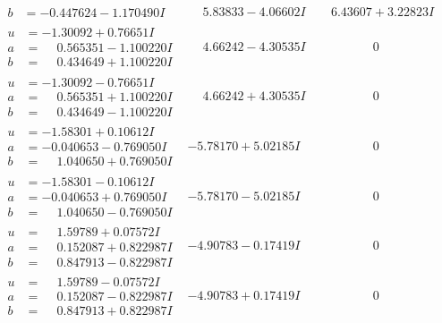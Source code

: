 \documentclass[1p]{elsarticle_modified}
\theoremstyle{definition}
\begin{document}
$$\begin{array}{c|c|c}
\begin{aligned}
b &= -0.447624 - 1.170490 I\end{aligned}
 & \phantom{-}5.83833 - 4.06602 I & \phantom{-}6.43607 + 3.22823 I \\ \hline\begin{aligned}
u &= -1.30092 + 0.76651 I \\
a &= \phantom{-}0.565351 - 1.100220 I \\
b &= \phantom{-}0.434649 + 1.100220 I\end{aligned}
 & \phantom{-}4.66242 - 4.30535 I & \phantom{-0.000000 } 0 \\ \hline\begin{aligned}
u &= -1.30092 - 0.76651 I \\
a &= \phantom{-}0.565351 + 1.100220 I \\
b &= \phantom{-}0.434649 - 1.100220 I\end{aligned}
 & \phantom{-}4.66242 + 4.30535 I & \phantom{-0.000000 } 0 \\ \hline\begin{aligned}
u &= -1.58301 + 0.10612 I \\
a &= -0.040653 - 0.769050 I \\
b &= \phantom{-}1.040650 + 0.769050 I\end{aligned}
 & -5.78170 + 5.02185 I & \phantom{-0.000000 } 0 \\ \hline\begin{aligned}
u &= -1.58301 - 0.10612 I \\
a &= -0.040653 + 0.769050 I \\
b &= \phantom{-}1.040650 - 0.769050 I\end{aligned}
 & -5.78170 - 5.02185 I & \phantom{-0.000000 } 0 \\ \hline\begin{aligned}
u &= \phantom{-}1.59789 + 0.07572 I \\
a &= \phantom{-}0.152087 + 0.822987 I \\
b &= \phantom{-}0.847913 - 0.822987 I\end{aligned}
 & -4.90783 - 0.17419 I & \phantom{-0.000000 } 0 \\ \hline\begin{aligned}
u &= \phantom{-}1.59789 - 0.07572 I \\
a &= \phantom{-}0.152087 - 0.822987 I \\
b &= \phantom{-}0.847913 + 0.822987 I\end{aligned}
 & -4.90783 + 0.17419 I & \phantom{-0.000000 } 0 \\ \hline\begin{aligned}

\end{aligned}
\end{array}$$
\end{document}
